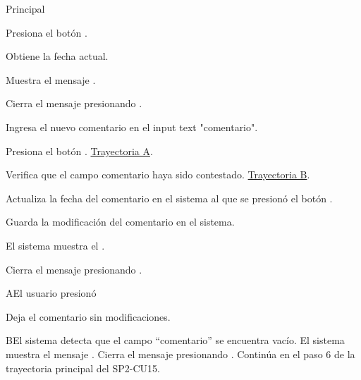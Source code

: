 \begin{UCtrayectoria}{Principal}


    \UCpaso[\UCactor] Presiona el botón . 
    
    \UCpaso Obtiene la fecha actual. 
    
    \UCpaso Muestra el mensaje .

    \UCpaso[\UCactor] Cierra el mensaje presionando .
    
    \UCpaso[\UCactor] Ingresa el nuevo comentario en el input text "comentario".
    
    \UCpaso[\UCactor] Presiona el botón . \hyperref[SP2-CU15-A]{Trayectoria A}.
    
    \UCpaso Verifica que el campo comentario haya sido contestado. \hyperref[SP2-CU15-B]{Trayectoria B}.

    \UCpaso Actualiza la fecha del comentario en el sistema al que se presionó el botón .

    \UCpaso Guarda la modificación del comentario en el sistema.

    \UCpaso El sistema muestra el  .

    \UCpaso[\UCactor] Cierra el mensaje presionando .


\end{UCtrayectoria}


\label{SP2-CU15-A}
\begin{UCtrayectoriaA}{A}{El usuario presionó }

  \UCpaso Deja el comentario sin modificaciones.
\end{UCtrayectoriaA}

\label{SP2-CU15-B}
\begin{UCtrayectoriaA}{B}{El sistema detecta que el campo “comentario” se encuentra vacío.} 
    \UCpaso El sistema muestra el mensaje .
    \UCpaso[\UCactor] Cierra el mensaje presionando .
    \UCpaso Continúa en el paso 6 de la trayectoria principal del SP2-CU15.
\end{UCtrayectoriaA}
